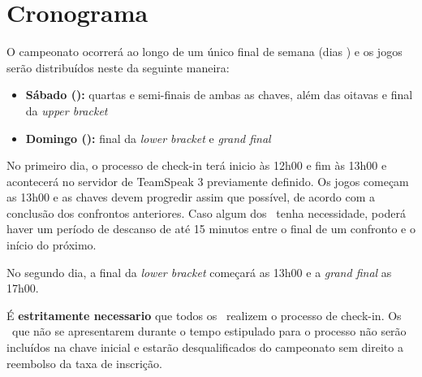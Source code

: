\section{Cronograma}

O campeonato ocorrerá ao longo de um único final de semana (dias \FullDate) e os jogos serão distribuídos neste da seguinte maneira:

\begin{itemize}
    \item \textbf{Sábado (\FirstDayShort):} quartas e semi-finais de ambas as chaves, além das oitavas e final da \textit{upper bracket}
    \item \textbf{Domingo (\SecondDayShort):} final da \textit{lower bracket} e \textit{grand final}
\end{itemize}

No primeiro dia, o processo de check-in terá inicio às 12h00 e fim às 13h00 e acontecerá no servidor de TeamSpeak 3 previamente definido.  Os jogos começam as 13h00 e as chaves devem progredir assim que possível, de acordo com a conclusão dos confrontos anteriores. Caso algum dos \BasicUnitPl\ tenha necessidade, poderá haver um período de descanso de até 15 minutos entre o final de um confronto e o início do próximo.

No segundo dia, a final da \textit{lower bracket} começará as 13h00 e a \textit{grand final} as 17h00.

É \textbf{estritamente necessario} que todos os \BasicUnitPl\ realizem o processo de check-in. Os \BasicUnitPl\ que não se apresentarem durante o tempo estipulado para o processo não serão incluídos na chave inicial e estarão desqualificados do campeonato sem direito a reembolso da taxa de inscrição.